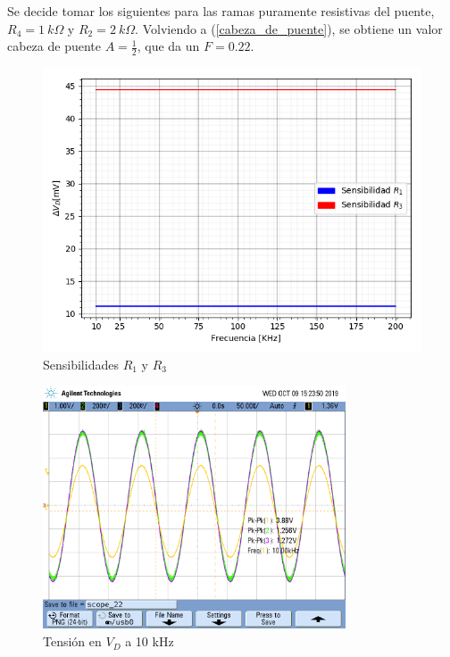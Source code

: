 Se decide tomar los siguientes para las ramas puramente resistivas del puente, $R_4= 1 \ k\Omega$ y $R_2= 2 \ k\Omega$. Volviendo a (\ref{cabeza_de_puente}), se obtiene un valor cabeza de puente $A=\frac{1}{2}$, que da un $F=0.22$.

\begin{figure}[H]
\centering
\includegraphics[scale=0.7]{Graficos/Sensibilidad}
\caption{Sensibilidades $R_1$ y $R_3$}
\label{fig:Sensibilidades}
\end{figure}



\begin{figure}[H]
\centering
\includegraphics[width=0.8\textwidth,trim={0 3.45cm 0.1cm 1.75cm},clip]{Mediciones/Tensiones_10_KHz}
\caption{Tensión en $V_D$ a 10 kHz}
\label{fig:Tensiones_10_KHz}
\end{figure}

